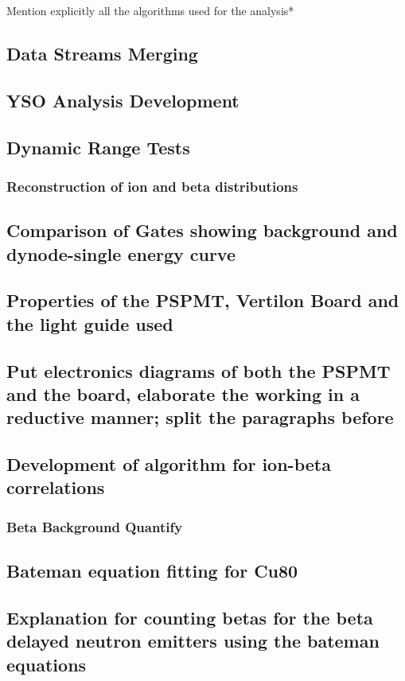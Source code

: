 	
	


\*Mention explicitly all the algorithms used for the analysis*\
\subsection{Data Streams Merging}
\subsection{YSO Analysis Development}
\subsection {Dynamic Range Tests}
\subsubsection{Reconstruction of ion and beta distributions}
\subsection{Comparison of Gates showing background and dynode-single energy curve}
\subsection{Properties of the PSPMT, Vertilon Board and the light guide used}
\subsection{Put electronics diagrams of both the PSPMT and the board, elaborate the working in a reductive manner; split the paragraphs before}
\subsection{Development of algorithm for ion-beta correlations}
\subsubsection{Beta Background Quantify}
\subsection{Bateman equation fitting for Cu80}
\subsection{Explanation for counting betas for the beta delayed neutron emitters using the bateman equations}
